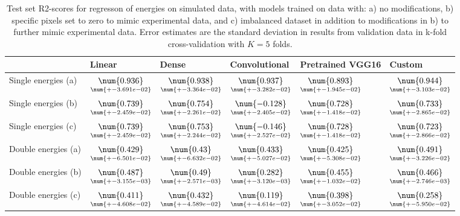 \begin{table}
\centering
\caption{
Test set R2-scores for regresson of energies on simulated data, with models trained on data with: 
a) no modifications, b) specific pixels set to zero to mimic experimental data, and c) imbalanced dataset
in addition to modifications in b) to further mimic experimental data. Error estimates are the standard deviation 
in results from validation data in k-fold cross-validation with $K=5$ folds.
}
\label{tab:regression-simulated-all-energies-r2}
\begin{tabular}{llllll}
\toprule
{} &                                              Linear &                                               Dense &                                        Convolutional &                                    Pretrained VGG16 &                                              Custom \\
\midrule
Single energies (a) &  $\underset{\num{+- 3.691e-02 }  }{\num{ 0.936 } }$ &  $\underset{\num{+- 3.364e-02 }  }{\num{ 0.938 } }$ &  $\underset{\num{+- 3.282e-02 }  }{\num{ 0.937 } }$ &  $\underset{\num{+- 1.945e-02 }  }{\num{ 0.893 } }$ &  $\underset{\num{+- 3.103e-02 }  }{\num{ 0.944 } }$ \\
Single energies (b) &  $\underset{\num{+- 2.459e-02 }  }{\num{ 0.739 } }$ &  $\underset{\num{+- 2.261e-02 }  }{\num{ 0.754 } }$ &  $\underset{\num{+- 2.405e-02 }  }{\num{ -0.128 } }$ &  $\underset{\num{+- 1.418e-02 }  }{\num{ 0.728 } }$ &  $\underset{\num{+- 2.865e-02 }  }{\num{ 0.733 } }$ \\
Single energies (c) &  $\underset{\num{+- 2.459e-02 }  }{\num{ 0.739 } }$ &  $\underset{\num{+- 2.244e-02 }  }{\num{ 0.753 } }$ &  $\underset{\num{+- 2.527e-02 }  }{\num{ -0.146 } }$ &  $\underset{\num{+- 1.418e-02 }  }{\num{ 0.728 } }$ &  $\underset{\num{+- 2.866e-02 }  }{\num{ 0.723 } }$ \\
Double energies (a) &  $\underset{\num{+- 6.501e-02 }  }{\num{ 0.429 } }$ &  $\underset{\num{+- 6.632e-02 }  }{\num{ 0.43 } }$ &  $\underset{\num{+- 5.027e-02 }  }{\num{ 0.433 } }$ &  $\underset{\num{+- 5.308e-02 }  }{\num{ 0.425 } }$ &  $\underset{\num{+- 3.226e-02 }  }{\num{ 0.491 } }$ \\
Double energies (b) &  $\underset{\num{+- 3.155e-03 }  }{\num{ 0.487 } }$ &  $\underset{\num{+- 2.571e-03 }  }{\num{ 0.49 } }$ &  $\underset{\num{+- 3.120e-03 }  }{\num{ 0.282 } }$ &  $\underset{\num{+- 1.032e-02 }  }{\num{ 0.455 } }$ &  $\underset{\num{+- 2.746e-03 }  }{\num{ 0.466 } }$ \\
Double energies (c) &  $\underset{\num{+- 4.608e-02 }  }{\num{ 0.411 } }$ &  $\underset{\num{+- 4.589e-02 }  }{\num{ 0.432 } }$ &  $\underset{\num{+- 4.614e-02 }  }{\num{ 0.119 } }$ &  $\underset{\num{+- 3.052e-02 }  }{\num{ 0.398 } }$ &  $\underset{\num{+- 5.950e-02 }  }{\num{ 0.258 } }$ \\
\bottomrule
\end{tabular}
\end{table}
